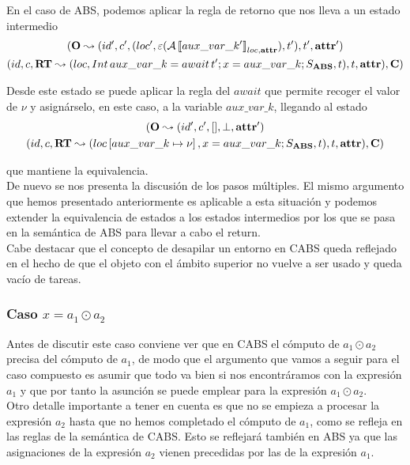 En el caso de ABS, podemos aplicar la regla de retorno que nos lleva a un estado intermedio
\begin{multline*}
  (\mathbf{O} \leadsto (id', c', (loc', \varepsilon(\mathcal{A} \left\llbracket aux\_var\_k' \right\rrbracket_{loc, \textbf{attr}}), t'), t', \textbf{attr}')\\
  (id, c, \textbf{RT} \leadsto (loc, Int\, aux\_var\_k = await\,t'\mbox{;\,} x = aux\_var\_k\mbox{;\,} S_{\textbf{ABS}}, t), t, \textbf{attr}), \mathbf{C})
\end{multline*}

Desde este estado se puede aplicar la regla del $await$ que permite recoger el valor de $\nu$ y asignárselo, en este caso, a la variable $aux\_var\_k$, llegando al estado
\begin{multline*}
  (\mathbf{O} \leadsto (id', c', [], \perp, \textbf{attr}')\\
  (id, c, \textbf{RT} \leadsto (loc\left[ aux\_var\_k\mapsto\nu \right], x = aux\_var\_k\mbox{;\,} S_{\textbf{ABS}}, t), t, \textbf{attr}), \mathbf{C})
\end{multline*}

que mantiene la equivalencia.\\

De nuevo se nos presenta la discusión de los pasos múltiples. El mismo argumento que hemos presentado anteriormente es aplicable a esta situación y podemos extender la equivalencia de estados a los estados intermedios por los que se pasa en la semántica de ABS para llevar a cabo el return.\\

Cabe destacar que el concepto de desapilar un entorno en CABS queda reflejado en el hecho de que el objeto con el ámbito superior no vuelve a ser usado y queda vacío de tareas.

\subsubsection{Caso $x = a_1 \odot a_2$}

Antes de discutir este caso conviene ver que en CABS el cómputo de $a_1 \odot a_2$ precisa del cómputo de $a_1$, de modo que el argumento que vamos a seguir para el caso compuesto es asumir que todo va bien si nos encontráramos con la expresión $a_1$ y que por tanto la asunción se puede emplear para la expresión $a_1 \odot a_2$.\\

Otro detalle importante a tener en cuenta es que no se empieza a procesar la expresión $a_2$ hasta que no hemos completado el cómputo de $a_1$, como se refleja en las reglas de la semántica de CABS. Esto se reflejará también en ABS ya que las asignaciones de la expresión $a_2$ vienen precedidas por las de la expresión $a_1$.\\

